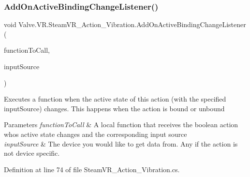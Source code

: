 \mbox{\label{class_valve_1_1_v_r_1_1_steam_v_r___action___vibration_accfc5869c3abe1a5f4911c182679aef3}} 
\subsubsection{\texorpdfstring{AddOnActiveBindingChangeListener()}{AddOnActiveBindingChangeListener()}}
{\footnotesize\ttfamily void Valve.\+V\+R.\+Steam\+V\+R\+\_\+\+Action\+\_\+\+Vibration.\+Add\+On\+Active\+Binding\+Change\+Listener (\begin{DoxyParamCaption}\item[{\mbox{\hyperlink{class_valve_1_1_v_r_1_1_steam_v_r___action___vibration_a7706b3c9b71de3bea16a3fab8a882f0b}{Active\+Change\+Handler}}}]{function\+To\+Call,  }\item[{\mbox{\hyperlink{namespace_valve_1_1_v_r_a82e5bf501cc3aa155444ee3f0662853f}{Steam\+V\+R\+\_\+\+Input\+\_\+\+Sources}}}]{input\+Source }\end{DoxyParamCaption})}



Executes a function when the active state of this action (with the specified input\+Source) changes. This happens when the action is bound or unbound 


\begin{DoxyParams}{Parameters}
{\em function\+To\+Call} & A local function that receives the boolean action who\textquotesingle{}s active state changes and the corresponding input source\\
\hline
{\em input\+Source} & The device you would like to get data from. Any if the action is not device specific.\\
\hline
\end{DoxyParams}


Definition at line 74 of file Steam\+V\+R\+\_\+\+Action\+\_\+\+Vibration.\+cs.

\mbox{\label{class_valve_1_1_v_r_1_1_steam_v_r___action___vibration_afce165e6e31e7a65b14d978976cd028c}} 
